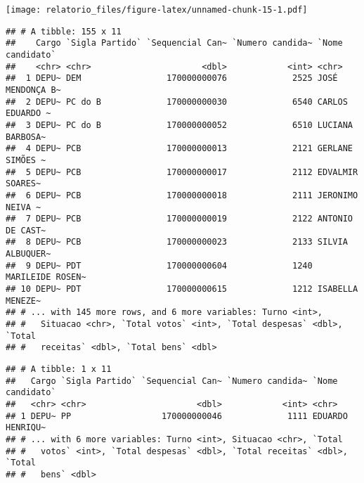 \documentclass[]{article}
\newenvironment{Shaded}{\begin{snugshade}}{\end{snugshade}}
\newcommand{\KeywordTok}[1]{\textcolor[rgb]{0.13,0.29,0.53}{\textbf{#1}}}
\newcommand{\DataTypeTok}[1]{\textcolor[rgb]{0.13,0.29,0.53}{#1}}
\newcommand{\DecValTok}[1]{\textcolor[rgb]{0.00,0.00,0.81}{#1}}
\newcommand{\StringTok}[1]{\textcolor[rgb]{0.31,0.60,0.02}{#1}}
\newcommand{\CommentTok}[1]{\textcolor[rgb]{0.56,0.35,0.01}{\textit{#1}}}
\newcommand{\OperatorTok}[1]{\textcolor[rgb]{0.81,0.36,0.00}{\textbf{#1}}}
\newcommand{\NormalTok}[1]{#1}
\begin{document}
\texttt{[image: relatorio\_files/figure-latex/unnamed-chunk-15-1.pdf]}

\begin{Shaded}
\end{Shaded}

\begin{verbatim}
## # A tibble: 155 x 11
##    Cargo `Sigla Partido` `Sequencial Can~ `Numero candida~ `Nome candidato`
##    <chr> <chr>                      <dbl>            <int> <chr>           
##  1 DEPU~ DEM                 170000000076             2525 JOSÉ MENDONÇA B~
##  2 DEPU~ PC do B             170000000030             6540 CARLOS EDUARDO ~
##  3 DEPU~ PC do B             170000000052             6510 LUCIANA BARBOSA~
##  4 DEPU~ PCB                 170000000013             2121 GERLANE SIMÕES ~
##  5 DEPU~ PCB                 170000000017             2112 EDVALMIR SOARES~
##  6 DEPU~ PCB                 170000000018             2111 JERONIMO NEIVA ~
##  7 DEPU~ PCB                 170000000019             2122 ANTONIO DE CAST~
##  8 DEPU~ PCB                 170000000023             2133 SILVIA ALBUQUER~
##  9 DEPU~ PDT                 170000000604             1240 MARILEIDE ROSEN~
## 10 DEPU~ PDT                 170000000615             1212 ISABELLA MENEZE~
## # ... with 145 more rows, and 6 more variables: Turno <int>,
## #   Situacao <chr>, `Total votos` <int>, `Total despesas` <dbl>, `Total
## #   receitas` <dbl>, `Total bens` <dbl>
\end{verbatim}

\begin{Shaded}
\end{Shaded}

\begin{verbatim}
## # A tibble: 1 x 11
##   Cargo `Sigla Partido` `Sequencial Can~ `Numero candida~ `Nome candidato`
##   <chr> <chr>                      <dbl>            <int> <chr>           
## 1 DEPU~ PP                  170000000046             1111 EDUARDO HENRIQU~
## # ... with 6 more variables: Turno <int>, Situacao <chr>, `Total
## #   votos` <int>, `Total despesas` <dbl>, `Total receitas` <dbl>, `Total
## #   bens` <dbl>
\end{verbatim}
\end{document}
